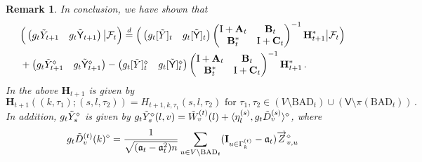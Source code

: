\documentclass[11pt]{article}
\newtheorem{Remark}[Theorem]{Remark}
\numberwithin{equation}{section}
\begin{document}
\begin{Remark} \label{remark-conditional-Gaussian}
In conclusion, we have shown that  
    \begin{align}
    & \Big(\begin{pmatrix}
    g_t \Tilde{Y}_{t+1} & g_t \Tilde{\mathsf{Y}}_{t+1}  
    \end{pmatrix} \big| \mathcal{F}_{t} \Big)  \overset{d}{=} 
    \Big( 
    \begin{pmatrix}
        g_t[\Tilde{Y}]_{t} &
        g_t[\Tilde{\mathsf{Y}}]_{t}  
    \end{pmatrix}
    \begin{pmatrix}
        \mathrm{I} + \mathbf{A}_t  & \mathbf{B}_t \\
        \mathbf{B}_t^{*} & \mathrm{I} + \mathbf{C}_t
    \end{pmatrix}^{-1}
    \mathbf{H}_{t+1}^{*} \big| \mathcal{F}_{t}\Big)
    \label{equ-projection-part}  \\
    & +  \begin{pmatrix}
    g_t \Tilde{Y}_{t+1}^{\diamond} & g_t \Tilde{\mathsf{Y}}_{t+1}^{\diamond}    
    \end{pmatrix} -
    \begin{pmatrix}
        g_t [\Tilde{Y}]_{t}^{\diamond} &
        g_t [\Tilde{\mathsf{Y}}]_{t}^{\diamond}  
    \end{pmatrix}
    \begin{pmatrix}
        \mathrm{I} + \mathbf{A}_t  & \mathbf{B}_t \\
        \mathbf{B}_t^{*} & \mathrm{I} + \mathbf{C}_t
    \end{pmatrix}^{-1} 
    \mathbf{H}_{t+1}^{*}  \,.
    \label{equ-Gaussian-part}
\end{align}
In the above $\mathbf{H}_{t+1}$ is given by 
\begin{equation}\label{eq-def-H-entry}
    \mathbf{H}_{t+1}( (k,\tau_1);(s,l,\tau_2) ) = H_{t+1,k,\tau_1}(s,l,\tau_2) \mbox{ for } \tau_1, \tau_2 \in ( V \setminus \mathrm{BAD}_t ) \cup (\mathsf{V} \setminus \pi(\mathrm{BAD}_t) ) \,.
\end{equation}
In addition, $g_t \Tilde{Y}^{\diamond}_s$ is given by $g_t \Tilde{Y}^{\diamond}_s (l,v) = \Tilde{W}^{(t)}_v(l) + \langle \eta^{(s)}_l, g_t\Tilde{D}^{(s)}_v \rangle^{\diamond}$, where
\begin{align*}
    g_t\Tilde{D}^{(t)}_v(k)^{\diamond} =  \frac{1}{\sqrt{(\mathfrak{a}_t - \mathfrak{a}_t^2) n}} \sum_{u \in V \setminus \mathrm{BAD}_t }( \mathbf{I}_{u \in \Gamma^{(t)}_k} - \mathfrak{a}_t) \overrightarrow{Z}_{v,u}^{\diamond}

\end{align*}
\end{Remark}
\end{document}
